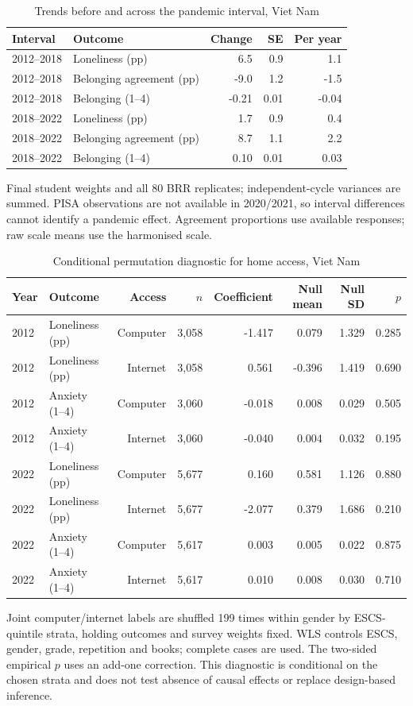 \begin{table}[H]\centering\scriptsize
\caption{Trends before and across the pandemic interval, Viet Nam}\label{tab:pandemic}
\begin{tabular}{@{}llrrr@{}}
\toprule
Interval & Outcome & Change & SE & Per year\\
\midrule
2012--2018 & Loneliness (pp) & 6.5 & 0.9 & 1.1\\
2012--2018 & Belonging agreement (pp) & -9.0 & 1.2 & -1.5\\
2012--2018 & Belonging (1--4) & -0.21 & 0.01 & -0.04\\
2018--2022 & Loneliness (pp) & 1.7 & 0.9 & 0.4\\
2018--2022 & Belonging agreement (pp) & 8.7 & 1.1 & 2.2\\
2018--2022 & Belonging (1--4) & 0.10 & 0.01 & 0.03\\
\bottomrule
\end{tabular}
\par\smallskip\raggedright\footnotesize Final student weights and all 80 BRR replicates; independent-cycle variances are summed. PISA observations are not available in 2020/2021, so interval differences cannot identify a pandemic effect. Agreement proportions use available responses; raw scale means use the harmonised scale.
\end{table}

\begin{table}[H]\centering\scriptsize
\caption{Conditional permutation diagnostic for home access, Viet Nam}\label{tab:perm}
\begin{tabular}{@{}llrrrrrr@{}}
\toprule
Year & Outcome & Access & $n$ & Coefficient & Null mean & Null SD & $p$\\
\midrule
2012 & Loneliness (pp) & Computer & 3,058 & -1.417 & 0.079 & 1.329 & 0.285\\
2012 & Loneliness (pp) & Internet & 3,058 & 0.561 & -0.396 & 1.419 & 0.690\\
2012 & Anxiety (1--4) & Computer & 3,060 & -0.018 & 0.008 & 0.029 & 0.505\\
2012 & Anxiety (1--4) & Internet & 3,060 & -0.040 & 0.004 & 0.032 & 0.195\\
2022 & Loneliness (pp) & Computer & 5,677 & 0.160 & 0.581 & 1.126 & 0.880\\
2022 & Loneliness (pp) & Internet & 5,677 & -2.077 & 0.379 & 1.686 & 0.210\\
2022 & Anxiety (1--4) & Computer & 5,617 & 0.003 & 0.005 & 0.022 & 0.875\\
2022 & Anxiety (1--4) & Internet & 5,617 & 0.010 & 0.008 & 0.030 & 0.710\\
\bottomrule
\end{tabular}
\par\smallskip\raggedright\footnotesize Joint computer/internet labels are shuffled 199 times within gender by ESCS-quintile strata, holding outcomes and survey weights fixed. WLS controls ESCS, gender, grade, repetition and books; complete cases are used. The two-sided empirical $p$ uses an add-one correction. This diagnostic is conditional on the chosen strata and does not test absence of causal effects or replace design-based inference.
\end{table}

